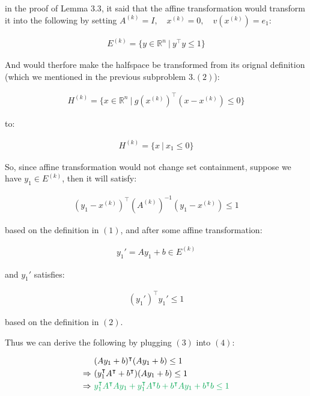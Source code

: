 \documentclass{article}
\begin{document}
in the proof of Lemma $3.3$, 
it said that the affine transformation would transform it into the following by setting
$A^{(k)} = I, \quad x^{(k)} = 0, \quad v ( x^{(k)} ) = e_1$:

\begin{align*}
    E^{(k)} = \{ y \in \mathbb{R}^n \ | \ y^\intercal y \le 1 \} \tag{2}
\end{align*}

And would therfore make the halfspace be transformed from its orignal definition (which we mentioned in the previous subproblem $3. (2)$):

\begin{align*}
    H^{(k)} = \{x \in \mathbb{R}^n \ | \ g(x^{(k)})^\intercal (x - x^{(k)}) \le 0\}
\end{align*}

to:

\begin{align*}
    H^{(k)} = \{ x \ | \ x_1 \le 0 \}
\end{align*}

So, since affine transformation would not change set containment,
suppose we have $y_1 \in E^{(k)}$, then it will satisfy:

\begin{align*}
    (y_1 - x^{(k)})^\intercal (A^{(k)})^{-1} (y_1 - x^{(k)}) \le 1 \tag{*}
\end{align*}

based on the definition in $(1)$, and after some affine transformation:

\begin{align*}
    y_1' = Ay_1 + b \in E^{(k)} \tag{3}
\end{align*}

and $y_1'$ satisfies:

\begin{align*}
    (y_1')^\intercal y_1' \le 1 \tag{4}
\end{align*}

based on the definition in $(2)$.
\bigskip

Thus we can derive the following by plugging $(3)$ into $(4)$:

\begin{align*}
    &(Ay_1 + b )^\intercal (Ay_1 + b ) \le 1 \\
    \Rightarrow \ & (y_1^\intercal A^\intercal + b^\intercal)(Ay_1 + b) \le 1 \\
    \Rightarrow \ & \textcolor{Green}{y_1^\intercal A^\intercal Ay_1 + y_1^\intercal A^\intercal b + b^\intercal A y_1 + b^\intercal b \le 1} \\
\end{align*}
\end{document}
